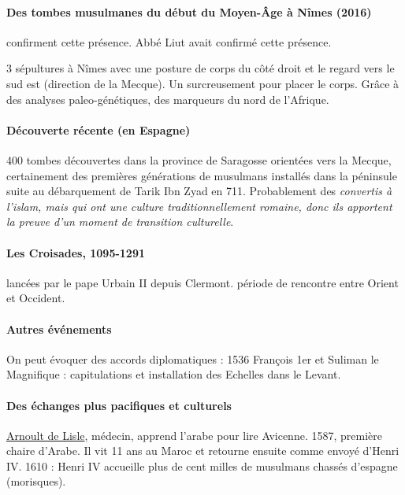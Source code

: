 \paragraph{Des tombes musulmanes du début du Moyen-Âge à Nîmes (2016)} confirment cette présence. Abbé Liut avait confirmé cette présence.

3 sépultures à Nîmes avec une posture de corps du côté droit et le regard vers le sud est (direction de la Mecque). Un surcreusement pour placer le corps. Grâce à des analyses paleo-génétiques, des marqueurs du nord de l'Afrique.

\paragraph{Découverte récente (en Espagne)}

400 tombes découvertes dans la province de Saragosse orientées vers la Mecque, certainement des premières générations de musulmans installés dans la péninsule suite au débarquement de Tarik Ibn Zyad en 711. Probablement des \textit{convertis à l'islam, mais qui ont une culture traditionnellement romaine, donc ils apportent la preuve d'un moment de transition culturelle}.


\paragraph{Les Croisades, 1095-1291}
lancées par le pape Urbain II depuis Clermont.
période de rencontre entre Orient et Occident.

\paragraph{Autres événements}
On peut évoquer des accords diplomatiques : 1536 François 1er et Suliman le Magnifique : capitulations et installation des Echelles dans le Levant.

\paragraph{Des échanges plus pacifiques et culturels} \href{https://fr.wikipedia.org/wiki/Arnoult_de_Lisle}{Arnoult de Lisle}, médecin, apprend l'arabe pour lire Avicenne. 1587, première chaire d'Arabe. Il vit 11 ans au Maroc et retourne ensuite comme envoyé d'Henri IV.
1610 : Henri IV accueille plus de cent milles de musulmans chassés d'espagne (morisques). 


